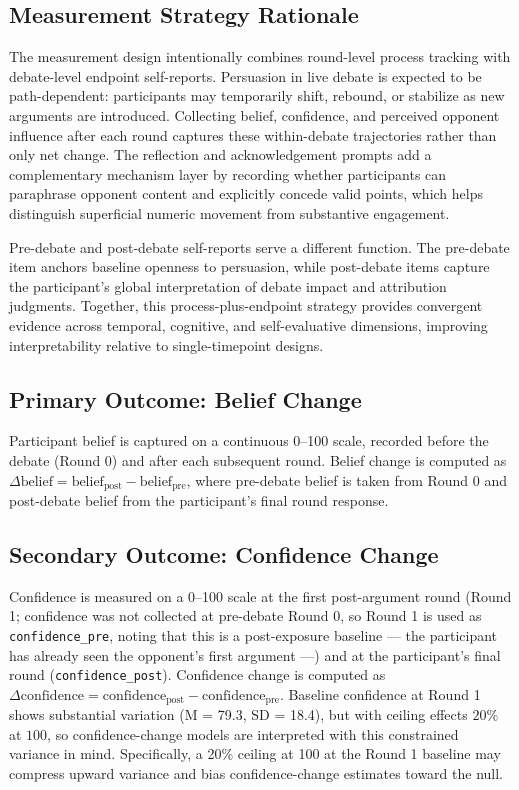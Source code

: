 \subsection{Measurement Strategy Rationale}

The measurement design intentionally combines round-level process tracking with
debate-level endpoint self-reports. Persuasion in live debate is expected to be
path-dependent: participants may temporarily shift, rebound, or stabilize as new
arguments are introduced. Collecting belief, confidence, and perceived opponent
influence after each round captures these within-debate trajectories rather than
only net change. The reflection and acknowledgement prompts add a complementary
mechanism layer by recording whether participants can paraphrase opponent content
and explicitly concede valid points, which helps distinguish superficial numeric
movement from substantive engagement.

Pre-debate and post-debate self-reports serve a different function. The pre-debate
item anchors baseline openness to persuasion, while post-debate items capture the
participant's global interpretation of debate impact and attribution judgments.
Together, this process-plus-endpoint strategy provides convergent evidence across
temporal, cognitive, and self-evaluative dimensions, improving interpretability
relative to single-timepoint designs.

\subsection{Primary Outcome: Belief Change}

Participant belief is captured on a continuous 0--100 scale, recorded before the
debate (Round 0) and after each subsequent round. Belief change is computed as
$\Delta \text{belief} = \text{belief}_{\text{post}} - \text{belief}_{\text{pre}}$,
where pre-debate belief is taken from Round 0 and post-debate belief from the
participant's final round response.

\subsection{Secondary Outcome: Confidence Change}

Confidence is measured on a 0--100 scale at the first post-argument round
(Round 1; confidence was not collected at pre-debate Round 0, so Round 1 is used as \texttt{confidence\_pre},
noting that this is a post-exposure baseline --- the participant has already seen the opponent's first argument ---)
and at the participant's final round (\texttt{confidence\_post}).
Confidence change is computed as
$\Delta \text{confidence} = \text{confidence}_{\text{post}} - \text{confidence}_{\text{pre}}$.
Baseline confidence at Round 1 shows substantial variation (M = 79.3, SD = 18.4),
but with ceiling effects \(20\%\) at \(100\), so confidence-change models are
interpreted with this constrained variance in mind.
Specifically, a 20\% ceiling at 100 at the Round 1 baseline may compress upward variance and
bias confidence-change estimates toward the null.

